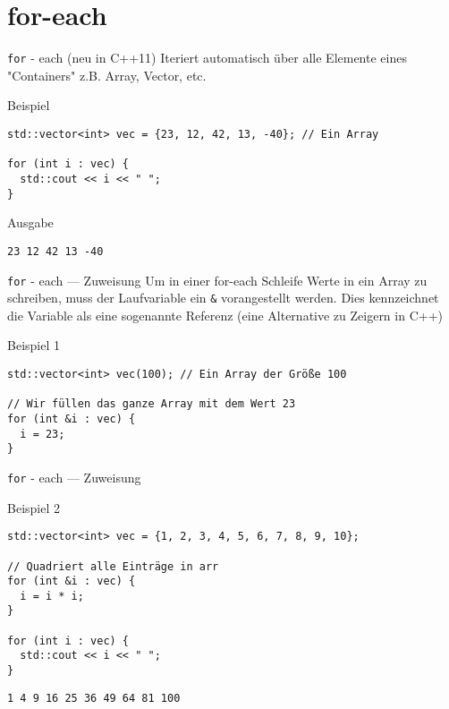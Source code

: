 \documentclass[presentation]{beamer}
\begin{document}
\section{for-each}
\label{sec:org67acf4e}
\begin{frame}[label={sec:org87128ab},fragile]{{\color{solarizedYellow}\texttt{for}} - each (neu in C++11)}
 Iteriert automatisch über alle Elemente eines "Containers" z.B. Array,
Vector, etc.
\begin{block}{Beispiel}
\begin{verbatim}
std::vector<int> vec = {23, 12, 42, 13, -40}; // Ein Array

for (int i : vec) {
  std::cout << i << " ";
}
\end{verbatim}
\end{block}
\begin{block}{Ausgabe}
\begin{verbatim}
23 12 42 13 -40
\end{verbatim}
\end{block}
\end{frame}
\begin{frame}[label={sec:org587dd44},fragile]{{\color{solarizedYellow}\texttt{for}} - each --- Zuweisung}
 Um in einer for-each Schleife Werte in ein Array zu schreiben, muss
der Laufvariable ein {\color{solarizedYellow}\verb!&!} vorangestellt werden. Dies kennzeichnet die
Variable als eine sogenannte \alert{Referenz} (eine Alternative zu Zeigern
in C++)
\begin{block}{Beispiel 1}
\begin{verbatim}
std::vector<int> vec(100); // Ein Array der Größe 100

// Wir füllen das ganze Array mit dem Wert 23
for (int &i : vec) {
  i = 23;
}
\end{verbatim}
\end{block}
\end{frame}
\begin{frame}[label={sec:org4f6316c},fragile]{{\color{solarizedYellow}\texttt{for}} - each --- Zuweisung}
 \begin{block}{Beispiel 2}
\begin{verbatim}
std::vector<int> vec = {1, 2, 3, 4, 5, 6, 7, 8, 9, 10};

// Quadriert alle Einträge in arr
for (int &i : vec) {
  i = i * i;
}

for (int i : vec) {
  std::cout << i << " ";
}
\end{verbatim}

\begin{verbatim}
1 4 9 16 25 36 49 64 81 100
\end{verbatim}
\end{block}
\end{frame}
\end{document}
